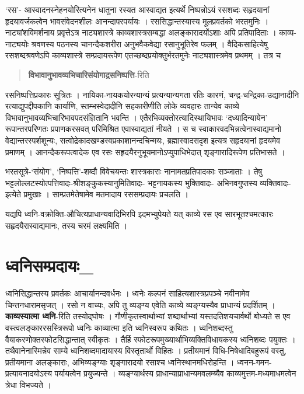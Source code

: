 {‘रस’- आस्वादनस्नेहनयोरित्यनेन धातुना रस्यत आस्वाद्यत इत्यर्थे निष्पन्नोऽयं रसशब्दः सहृदयानां हृदयावर्जकत्वेन भावसंवेदनशीलः आनन्दापरपर्यायः । रससिद्धान्तस्यास्य मूलप्रवर्तको भरतमुनिः । नाट्यांशविमर्शनाय प्रवृत्तेऽत्र नाट्यशास्त्रे काव्यशास्त्रसम्बद्धा अलङ्कारादयोंऽशाः अपि प्रतिपादिताः । काव्य-नाट्ययोः श्रवणस्य पठनस्य चानन्दैकशरीरा अनुभवैकवेद्या रसानुभूतिरेव फलम् । वैदिकसाहित्येषु रसशब्दश्रवणेऽपि काव्यशास्त्रे सम्प्रदायरूपेण एतच्छब्दप्रयोक्तुर्भरतमुनेः नाट्यशास्त्रमेव प्रथमम् । तत्र च 

\begin{verse}
\textbf{विभावानुभावव्यभिचारिसंयोगाद्रसनिष्पत्ति}-रिति 
\end{verse}

रसनिष्पत्तिप्रकारः सूत्रितः । नायिका-नायकयोरन्यान्यं प्रत्यन्यान्यगता रतिः कारणं, चन्द्र-चन्द्रिका-उद्यानादीनि रत्याद्युपद्दीपकानि कार्याणि, स्तम्भस्वेदादीनि सहकारीणीति लोके व्यवहारः तान्येव काव्ये विभावानुभावव्यभिचारिभावपदसंज्ञितानि भवन्ति । एतैरभिव्यक्तोरत्यादिस्थायिभावः ‘दध्यादिन्यायेन’ रूपान्तरपरिणतः प्रपाणकरसवत् परिमिश्रित एवास्वाद्यतां नीयते । स च स्वाकारवदभिन्नत्वेनास्वाद्यमानो वेद्यान्तरस्पर्शशून्यः, सत्वोद्रेकादखण्डस्वप्रकाशानन्दचिन्मयः, ब्रह्मास्वादसदृश इत्यत्र सहृदयानां हृदयमेव प्रमाणम् । आनन्दैकरूपत्वादेक एव रसः सहृदयैरनुभूयमानोऽप्युपाधिभेदात् शृङ्गारादिरूपेण प्रतिभासते ।

भरतसूत्रे-‘संयोग’, ‘निष्पत्ति’-शब्दौ विवेचयन्तः शास्त्रकाराः नानामतप्रतिपादकाः सञ्जाताः । तेषु भट्टलोल्लटस्योत्पत्तिवादः-श्रीशङ्कुकस्यानुमितिवादः- भट्टनायकस्य भुक्तिवादः- अभिनवगुप्तस्य व्यक्तिवादः-इत्येते प्रमुखाः । साम्प्रतमेतेषामेव मतमादाय रससम्प्रदायः प्रचलति ।

यद्यपि ध्वनि-वक्रोक्ति-औचित्यप्राधान्यवादिभिरपि इदमभ्युपेयते यत् काव्ये रस एव सारभूतश्चमत्कारः सहृदयैरास्वाद्यमानः, तस्य चरमं लक्ष्यमिति ।

\section*{ ध्वनिसम्प्रदायः\_}

ध्वनिसिद्धान्तस्य प्रवर्तकः आचार्यानन्दवर्धनः । ध्वनेः कल्पनं साहित्यशास्त्रप्रपञ्चे नवीनामेव चिन्तनधारामसृजत् । रसो न वाच्यः, अपि तु व्यङ्ग्य एवेति काव्ये व्यङ्ग्यस्यैव प्राधान्यं प्रदर्शितम् । \textbf{काव्यस्यात्मा ध्वनि}-रिति तस्योद्घोषः । गौणीकृतस्वार्थाभ्यां शब्दार्थाभ्यां यस्तदतिशयचार्वर्थो बोध्यते स एव वस्त्वलङ्काररसस्त्रिरूपो ध्वनिः काव्यात्मा इति ध्वनिस्वरूप कथितः । ध्वनिशब्दस्तु वैयाकरणोक्तस्फोटसिद्धान्तात् स्वीकृतः । तैर्हि स्फोटरूपमुख्यार्थाभिव्यक्तिविधायकस्य ध्वनिशब्दः पयुक्तः । तथैवानेनास्मिन्नेव साम्ये ध्वनिशब्दमादायास्य विस्तृतार्थो विहितः । प्रतीयमानं विधि-निषेधादिबहुरूपं वस्तु, प्रतीयमाना अलङ्काराः, अभिव्यङ्ग्याः शृङ्गारादयो रसाश्च ध्वनिस्थानमधिरोहन्ति । ध्वनन-गमन-प्रत्यायनादयोऽस्य पर्यायत्वेन प्रयुज्यन्ते । व्यङ्ग्यार्थस्य प्राधान्याप्राधान्यमवलम्ब्यैव काव्यमुत्तम-मध्यमाधमत्वेन त्रेधा विभज्यते ।

}
